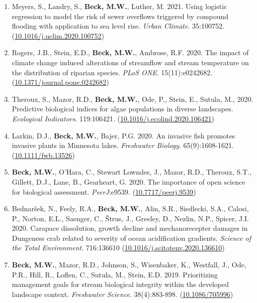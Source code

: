 \documentclass[letterpaper,12pt]{article}
\begin{document}
\begin{enumerate}
\item Meyers, S., Landry, S., \textbf{Beck, M.W.}, Luther, M. 2021. Using logistic regression to model the risk of sewer overflows triggered by compound flooding with application to sea level rise. \textit{Urban Climate}. 35:100752. ({\footnotesize\href{https://doi.org/10.1016/j.uclim.2020.100752}{10.1016/j.uclim.2020.100752}})

\item Rogers, J.B., Stein, E.D., \textbf{Beck, M.W.}, Ambrose, R.F. 2020. The impact of climate change induced alterations of streamflow and stream temperature on the distribution of riparian species. \textit{PLoS ONE}. 15(11):e0242682. ({\footnotesize\href{https://doi.org/10.1371/journal.pone.0242682}{10.1371/journal.pone.0242682}})

\item Theroux, S., Mazor, R.D., \textbf{Beck, M.W.}, Ode, P., Stein, E., Sutula, M., 2020. Predictive biological indices for algae populations in diverse landscapes. \textit{Ecological Indicators}. 119:106421. ({\footnotesize\href{https://doi.org/10.1016/j.ecolind.2020.106421}{10.1016/j.ecolind.2020.106421}})

\item Larkin, D.J., \textbf{Beck, M.W.}, Bajer, P.G. 2020. An invasive fish promotes invasive plants in Minnesota lakes. \textit{Freshwater Biology}. 65(9):1608-1621. ({\footnotesize\href{https://doi.org/10.1111/fwb.13526}{10.1111/fwb.13526}})

\item \textbf{Beck, M.W.}, O'Hara, C., Stewart Lowndes, J., Mazor, R.D., Theroux, S.T., Gillett, D.J., Lane, B., Gearheart, G. 2020. The importance of open science for biological assessment. \textit{PeerJ}:e9539. ({\footnotesize\href{https://doi.org/10.7717/peerj.9539}{10.7717/peerj.9539}})

\item Bednar\v{s}ek, N., Feely, R.A., \textbf{Beck, M.W.}, Alin, S.R., Siedlecki, S.A., Calosi, P., Norton, E.L., Saenger, C., \v{S}trus, J., Greeley, D., Nezlin, N.P., Spicer, J.I. 2020. Carapace dissolution, growth decline and mechanorecepter damages in {D}ungeness crab related to severity of ocean acidification gradients. \textit{Science of the Total Environment}. 716:136610 ({\footnotesize\href{https://doi.org/10.1016/j.scitotenv.2020.136610}{10.1016/j.scitotenv.2020.136610}})

\item \textbf{Beck, M.W.}, Mazor, R.D., Johnson, S., Wisenbaker, K., Westfall, J., Ode, P.R., Hill, R., Loflen, C., Sutula, M., Stein, E.D. 2019. Prioritizing management goals for stream biological integrity within the developed landscape context. \textit{Freshwater Science}. 38(4):883-898. ({\footnotesize\href{https://doi.org/10.1086/705996}{10.1086/705996}})


\end{enumerate}
\end{document}
